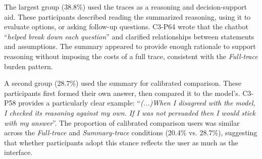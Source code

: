\documentclass[manuscript,review,anonymous]{acmart}
\begin{document}
The largest group (38.8\%) used the traces as a reasoning and decision-support aid. These participants described reading the summarized reasoning, using it to evaluate options, or asking follow-up questions. C3-P64 wrote that the chatbot ``\textit{helped break down each question}'' and clarified relationships between statements and assumptions. The summary appeared to provide enough rationale to support reasoning without imposing the costs of a full trace, consistent with the \textit{Full-trace} burden pattern.


A second group (28.7\%) used the summary for calibrated comparison. These participants first formed their own answer, then compared it to the model's. C3-P58 provides a particularly clear example: ``\textit{(...)When I disagreed with the model, I checked its reasoning against my own. If I was not persuaded then I would stick with my answer}''. The proportion of calibrated comparison users was similar across the \textit{Full-trace} and \textit{Summary-trace} conditions (20.4\% vs. 28.7\%), suggesting that whether participants adopt this stance reflects the user as much as the interface.

\end{document}
